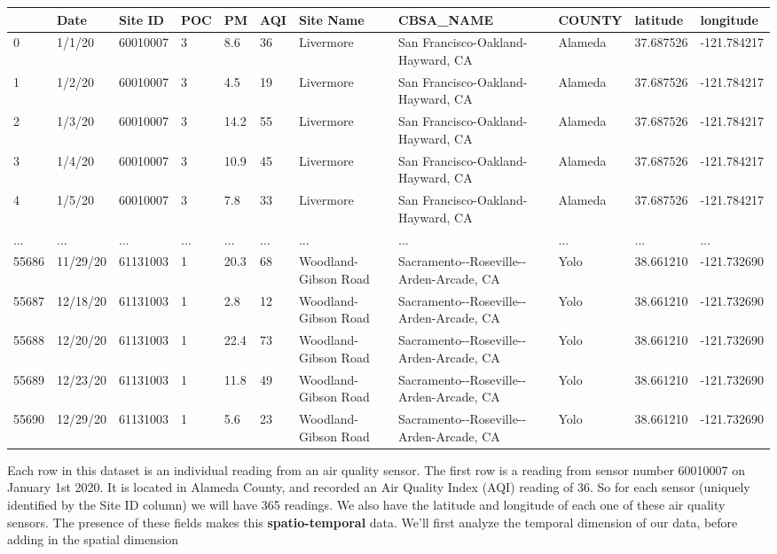 \documentclass[
  letterpaper,
  DIV=11,
  numbers=noendperiod]{scrreprt}
\begin{document}
\begin{longtable}[]{@{}lllllllllll@{}}
\toprule()
& Date & Site ID & POC & PM & AQI & Site Name & CBSA\_NAME & COUNTY &
latitude & longitude \\
\midrule()
\endhead
0 & 1/1/20 & 60010007 & 3 & 8.6 & 36 & Livermore & San
Francisco-Oakland-Hayward, CA & Alameda & 37.687526 & -121.784217 \\
1 & 1/2/20 & 60010007 & 3 & 4.5 & 19 & Livermore & San
Francisco-Oakland-Hayward, CA & Alameda & 37.687526 & -121.784217 \\
2 & 1/3/20 & 60010007 & 3 & 14.2 & 55 & Livermore & San
Francisco-Oakland-Hayward, CA & Alameda & 37.687526 & -121.784217 \\
3 & 1/4/20 & 60010007 & 3 & 10.9 & 45 & Livermore & San
Francisco-Oakland-Hayward, CA & Alameda & 37.687526 & -121.784217 \\
4 & 1/5/20 & 60010007 & 3 & 7.8 & 33 & Livermore & San
Francisco-Oakland-Hayward, CA & Alameda & 37.687526 & -121.784217 \\
... & ... & ... & ... & ... & ... & ... & ... & ... & ... & ... \\
55686 & 11/29/20 & 61131003 & 1 & 20.3 & 68 & Woodland-Gibson Road &
Sacramento-\/-Roseville-\/-Arden-Arcade, CA & Yolo & 38.661210 &
-121.732690 \\
55687 & 12/18/20 & 61131003 & 1 & 2.8 & 12 & Woodland-Gibson Road &
Sacramento-\/-Roseville-\/-Arden-Arcade, CA & Yolo & 38.661210 &
-121.732690 \\
55688 & 12/20/20 & 61131003 & 1 & 22.4 & 73 & Woodland-Gibson Road &
Sacramento-\/-Roseville-\/-Arden-Arcade, CA & Yolo & 38.661210 &
-121.732690 \\
55689 & 12/23/20 & 61131003 & 1 & 11.8 & 49 & Woodland-Gibson Road &
Sacramento-\/-Roseville-\/-Arden-Arcade, CA & Yolo & 38.661210 &
-121.732690 \\
55690 & 12/29/20 & 61131003 & 1 & 5.6 & 23 & Woodland-Gibson Road &
Sacramento-\/-Roseville-\/-Arden-Arcade, CA & Yolo & 38.661210 &
-121.732690 \\
\bottomrule()
\end{longtable}

Each row in this dataset is an individual reading from an air quality
sensor. The first row is a reading from sensor number 60010007 on
January 1st 2020. It is located in Alameda County, and recorded an Air
Quality Index (AQI) reading of 36. So for each sensor (uniquely
identified by the Site ID column) we will have 365 readings. We also
have the latitude and longitude of each one of these air quality
sensors. The presence of these fields makes this
\textbf{spatio-temporal} data. We'll first analyze the temporal
dimension of our data, before adding in the spatial dimension
\end{document}
